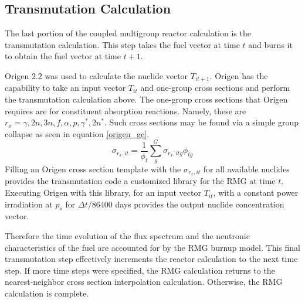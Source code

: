 \subsection{Transmutation Calculation}
\label{mg_sec:trans_calc}
The last portion of the coupled multigroup reactor calculation is the transmutation calculation.
This step takes the fuel vector at time $t$ and burns it to obtain the fuel vector at time $t+1$.

Origen 2.2 \cite{Croff2002} was used 
to calculate the nuclide vector $T_{it+1}$.  Origen has the capability to take an input vector 
$T_{it}$ and one-group cross sections and perform the transmutation calculation above.  The one-group 
cross sections that Origen requires are for constituent absorption reactions.  Namely, these are 
$r_x = \gamma, 2n, 3n, f, \alpha, p, \gamma^*, 2n^*$.  Such cross sections may be found via 
a simple group collapse as seen in equation \ref{origen_gc}.
\begin{equation}
\label{origen_gc}
\sigma_{r_x,it} = \frac{1}{\phi_t} \sum_g^G \sigma_{r_x,itg} \phi_{tg}
\end{equation}
Filling an Origen cross section template with the $\sigma_{r_x,it}$ for all available nuclides
provides the transmutation code a customized library for the RMG at time $t$.  Executing Origen
with this library, for an input vector $T_{it}$, with a constant power irradiation at $p_s$ for
$\Delta t / 86400$ days provides the output nuclide concentration vector.

Therefore the
time evolution of the flux spectrum and the neutronic characteristics of the fuel are accounted
for by the RMG burnup model.  This final transmutation step effectively increments the reactor
calculation to the next time step.  If more time steps were specified, the RMG calculation returns
to the nearest-neighbor cross section interpolation calculation.  Otherwise, the RMG calculation is
complete.


